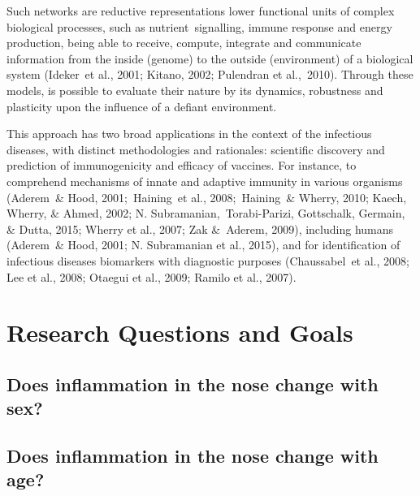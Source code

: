 \documentclass[
]{book}
\begin{document}
Such networks are reductive representations lower functional units of complex biological processes, such as nutrient~signalling, immune response and energy production, being able to receive, compute, integrate and communicate information from the inside (genome) to the outside (environment) of a biological system (Ideker~et al., 2001; Kitano, 2002; Pulendran et al.,~2010)⁠. Through these models, is possible to evaluate their nature by its dynamics, robustness and plasticity upon the influence of a defiant environment.

This approach has two broad applications in the context of the infectious diseases, with distinct methodologies and rationales: scientific discovery and prediction of immunogenicity and efficacy of vaccines. For instance, to comprehend mechanisms of innate and adaptive immunity in various organisms (Aderem~\& Hood, 2001;~Haining~et al., 2008;~Haining~\& Wherry, 2010; Kaech, Wherry, \& Ahmed, 2002; N. Subramanian,~Torabi-Parizi, Gottschalk, Germain, \& Dutta, 2015; Wherry et al., 2007; Zak \&~Aderem, 2009), including humans (Aderem~\& Hood, 2001; N. Subramanian et al., 2015)⁠, and for identification of infectious diseases biomarkers with diagnostic purposes (Chaussabel~et al., 2008; Lee et al., 2008; Otaegui et al., 2009; Ramilo et al., 2007).

\hypertarget{research-questions-and-goals}{%
\chapter{Research Questions and Goals}\label{research-questions-and-goals}}

\hypertarget{does-inflammation-in-the-nose-change-with-sex}{%
\section{Does inflammation in the nose change with sex?}\label{does-inflammation-in-the-nose-change-with-sex}}

\hypertarget{does-inflammation-in-the-nose-change-with-age}{%
\section{Does inflammation in the nose change with age?}\label{does-inflammation-in-the-nose-change-with-age}}
\end{document}
